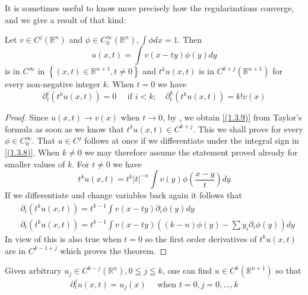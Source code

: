 It is sometimes useful to know more precisely how the regularizations converge, and we give a result of that kind:
\begin{theorem}
    Let $v \in C^{j}\left(\mathbb{R}^{n}\right)$ and $\phi \in C_{0}^{\infty}\left(\mathbb{R}^{n}\right), \int \phi d x=1$. Then
\begin{equation}
    \label{(1.3.8)}
	u(x, t)=\int v(x-t y) \phi(y) d y 
\end{equation}
is in $C^{\infty}$ in $\left\{(x, t) \in \mathbb{R}^{n+1}, t \neq 0\right\}$ and $t^{k} u(x, t)$ is in $C^{k+j}\left(\mathbb{R}^{n+1}\right)$ for every non-negative integer $k$. When $t=0$ we have
\begin{equation}
    \label{(1.3.9)}
	\partial_{t}^{i}\left(t^{k} u(x, t)\right)=0 \quad \text { if } i<k ; \quad \partial_{t}^{k}\left(t^{k} u(x, t)\right)=k ! v(x) 
\end{equation}
\end{theorem}
\begin{proof}
    Since $u(x, t) \rightarrow v(x)$ when $t \rightarrow 0$, by , we obtain \eqref{(1.3.9)} from Taylor's formula as soon as we know that $t^{k} u(x, t) \in C^{k+j}$. This we shall prove for every $\phi \in C_{0}^{\infty}$. That $u \in C^{j}$ follows at once if we differentiate under the integral sign in \eqref{(1.3.8)}. When $k \neq 0$ we may therefore assume the statement proved already for smaller values of $k$. For $t \neq 0$ we have
\[
	t^{k} u(x, t)=t^{k}|t|^{-n} \int v(y) \phi\left( \frac{x-y}{t} \right)  d y
\]
If we differentiate and change variables back again it follows that
\[
	\begin{aligned}
		 & \partial_{i}\left(t^{k} u(x, t)\right)=t^{k-1} \int v(x-t y) \partial_{i} \phi(y) d y                                      \\
		 & \partial_{t}\left(t^{k} u(x, t)\right)=t^{k-1} \int v(x-t y)\left((k-n) \phi(y)-\sum y_{i} \partial_{i} \phi(y)\right) d y
	\end{aligned}
\]
In view of  this is also true when $t=0$ so the first order derivatives of $t^{k} u(x, t)$ are in $C^{k-1+j}$ which proves the theorem.
\end{proof}
\begin{cor}
    Given arbitrary $u_{j} \in C^{k-j}\left(\mathbb{R}^{n}\right), 0 \leqq j \leqq k$, one can find $u \in C^{k}\left(\mathbb{R}^{n+1}\right)$ so that
\begin{equation}
    \label{(1.3.10)}
	\partial_{t}^{j} u(x, t)=u_{j}(x) \quad \text { when } t=0, j=0, \ldots, k
\end{equation}
\end{cor}

